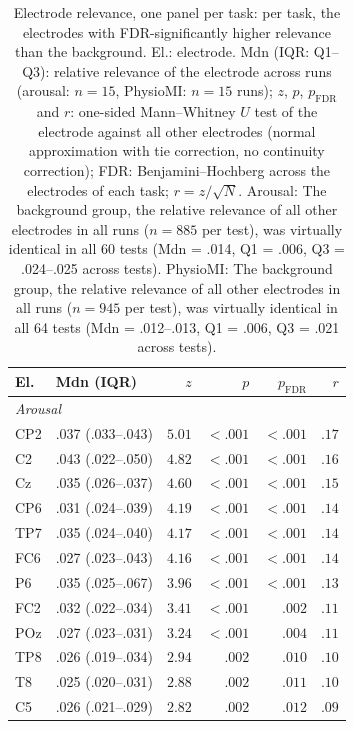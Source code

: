\begin{table}[ht]
\centering
\small
\setlength{\tabcolsep}{4pt}
\caption{Electrode relevance, one panel per task: per task, the electrodes with FDR-significantly higher relevance than the background. El.: electrode. Mdn (IQR: Q1--Q3): relative relevance of the electrode across runs (arousal: $n = 15$, PhysioMI: $n = 15$ runs); $z$, $p$, $p_{\mathrm{FDR}}$ and $r$: one-sided Mann--Whitney $U$ test of the electrode against all other electrodes (normal approximation with tie correction, no continuity correction); FDR: Benjamini--Hochberg across the electrodes of each task; $r = z / \sqrt{N}$. Arousal: The background group, the relative relevance of all other electrodes in all runs ($n = 885$ per test), was virtually identical in all 60 tests (Mdn = .014, Q1 = .006, Q3 = .024--.025 across tests). PhysioMI: The background group, the relative relevance of all other electrodes in all runs ($n = 945$ per test), was virtually identical in all 64 tests (Mdn = .012--.013, Q1 = .006, Q3 = .021 across tests).}
\label{tab:electrode_summary_both_tasks}
\begin{tabular}{llrrrr}
\toprule
El. & Mdn (IQR) & $z$ & $p$ & $p_{\mathrm{FDR}}$ & $r$ \\
\midrule
\multicolumn{6}{l}{\textit{Arousal}} \\
CP2 & .037 (.033--.043) & $5.01$ & $< .001$ & $< .001$ & $.17$ \\
C2 & .043 (.022--.050) & $4.82$ & $< .001$ & $< .001$ & $.16$ \\
Cz & .035 (.026--.037) & $4.60$ & $< .001$ & $< .001$ & $.15$ \\
CP6 & .031 (.024--.039) & $4.19$ & $< .001$ & $< .001$ & $.14$ \\
TP7 & .035 (.024--.040) & $4.17$ & $< .001$ & $< .001$ & $.14$ \\
FC6 & .027 (.023--.043) & $4.16$ & $< .001$ & $< .001$ & $.14$ \\
P6 & .035 (.025--.067) & $3.96$ & $< .001$ & $< .001$ & $.13$ \\
FC2 & .032 (.022--.034) & $3.41$ & $< .001$ & $.002$ & $.11$ \\
POz & .027 (.023--.031) & $3.24$ & $< .001$ & $.004$ & $.11$ \\
TP8 & .026 (.019--.034) & $2.94$ & $.002$ & $.010$ & $.10$ \\
T8 & .025 (.020--.031) & $2.88$ & $.002$ & $.011$ & $.10$ \\
C5 & .026 (.021--.029) & $2.82$ & $.002$ & $.012$ & $.09$ \\

\end{tabular}
\end{table}
